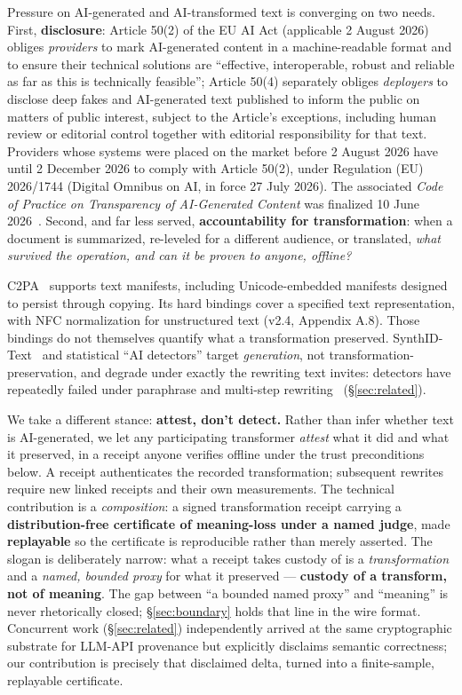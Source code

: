 \documentclass[11pt]{article}
\theoremstyle{definition}
\begin{document}
Pressure on AI-generated and AI-transformed text is converging on two needs.
First, \textbf{disclosure}: Article 50(2) of the EU AI Act (applicable
2 August 2026) obliges \emph{providers} to mark AI-generated content in a
machine-readable format and to ensure their technical solutions are
``effective, interoperable, robust and reliable as far as this is
technically feasible''; Article 50(4) separately obliges \emph{deployers}
to disclose deep fakes and AI-generated text published to inform the public
on matters of public interest, subject to the Article's exceptions, including
human review or editorial control together with editorial responsibility for
that text. Providers whose systems were placed on the
market before 2 August 2026 have until 2 December 2026 to comply with
Article 50(2), under Regulation (EU) 2026/1744 (Digital Omnibus on AI, in
force 27 July 2026). The associated \emph{Code of Practice on Transparency
of AI-Generated Content} was finalized 10 June 2026~\cite{euaiact}. Second, and far less served,
\textbf{accountability for transformation}: when a document is summarized,
re-leveled for a different audience, or translated, \emph{what survived the
operation, and can it be proven to anyone, offline?}

C2PA~\cite{c2pa} supports text manifests, including Unicode-embedded
manifests designed to persist through copying. Its hard bindings cover a
specified text representation, with NFC normalization for unstructured text
(v2.4, Appendix A.8). Those bindings do not themselves quantify what a
transformation preserved.
SynthID-Text~\cite{dathathri2024} and statistical ``AI detectors'' target
\emph{generation}, not transformation-preservation, and degrade under
exactly the rewriting text invites: detectors have repeatedly
failed under paraphrase and multi-step
rewriting~\cite{advparaphrase2025,synthidrobust2025,chainwash2026}
(\S\ref{sec:related}).

We take a different stance: \textbf{attest, don't detect.} Rather than infer
whether text is AI-generated, we let any participating transformer
\emph{attest} what it did and what it preserved, in a receipt anyone
verifies offline under the trust preconditions below. A receipt authenticates
the recorded transformation; subsequent rewrites require new linked receipts
and their own measurements. The technical contribution is a \emph{composition}: a
signed transformation receipt carrying a \textbf{distribution-free
certificate of meaning-loss under a named judge}, made \textbf{replayable}
so the certificate is reproducible rather than merely asserted. The slogan
is deliberately narrow: what a receipt takes custody of is a
\emph{transformation} and a \emph{named, bounded proxy} for what it
preserved --- \textbf{custody of a transform, not of meaning}. The gap
between ``a bounded named proxy'' and ``meaning'' is never rhetorically
closed; \S\ref{sec:boundary} holds that line in the wire format. Concurrent
work (\S\ref{sec:related}) independently arrived at the same cryptographic
substrate for LLM-API provenance but explicitly disclaims semantic
correctness; our contribution is precisely that disclaimed delta, turned
into a finite-sample, replayable certificate.
\end{document}

